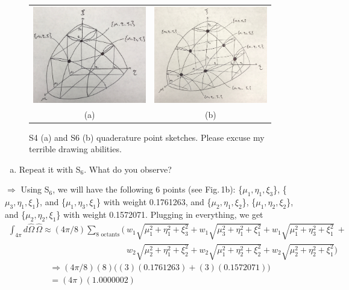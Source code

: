 \documentclass[10pt]{article}
\begin{document}
\begin{figure}[H]
    \centering
    \begin{tabular}{cc}
        \includegraphics[height=120pt]{Figures/S4.jpg} &
        \includegraphics[height=120pt]{Figures/S6.jpg} \\
        \scriptsize{(a)} & \scriptsize{(b)} \\ [-1.2ex]
    \end{tabular}
    \caption{S4 (a) and S6 (b) quaderature point sketches. Please excuse my terrible drawing abilities.}
    \label{fig1}
\end{figure}


\vspace{10pt}
\begin{enumerate}[(b)]
\item Repeat it with S$_6$. What do you observe?\\[-5pt]
\end{enumerate}

$\Rightarrow$ Using S$_6$, we will have the following 6 points (see Fig.\,1b): \{$\mu_1, \eta_1, \xi_3$\}, \{$\mu_3, \eta_1, \xi_1$\}, and \{$\mu_1, \eta_3, \xi_1$\} with weight 0.1761263, and \{$\mu_2, \eta_1, \xi_2$\}, \{$\mu_1, \eta_2, \xi_2$\}, and \{$\mu_2, \eta_2, \xi_1$\} with weight 0.1572071. Plugging in everything, we get
%
\begin{align*}
        \int_{4\pi} d\hat{\Omega}\,\hat{\Omega} \approx (4\pi/8) \sum_{\textrm{8 octants}} \Big( &w_1\sqrt{\mu_1^2 + \eta_1^2 + \xi_3^2} + w_1\sqrt{\mu_3^2 + \eta_1^2 + \xi_1^2} + w_1\sqrt{\mu_1^2 + \eta_3^2 + \xi_1^2} \ + \\
        &w_2\sqrt{\mu_2^2 + \eta_1^2 + \xi_2^2} + w_2\sqrt{\mu_1^2 + \eta_2^2 + \xi_2^2} + w_2\sqrt{\mu_2^2 + \eta_2^2 + \xi_1^2} \Big)
\end{align*}
%
\begin{align*}
        &\Rightarrow (4\pi/8)(8)\Big((3)(0.1761263) + (3)(0.1572071)\Big) \\
        &= (4\pi)(1.0000002)
\end{align*}
\end{document}
